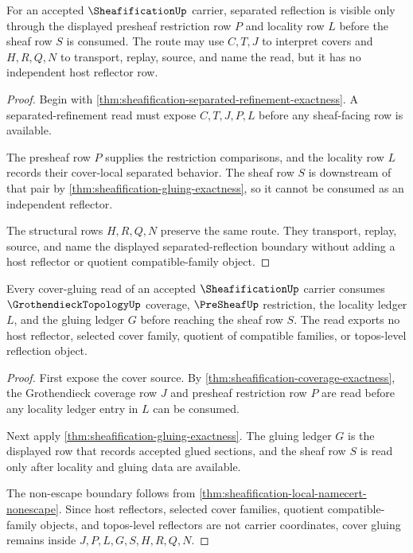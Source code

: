\begin{theorem}
\label{thm:sheafification-separated-reflection-route}
For an accepted $\SheafificationUp$ carrier, separated reflection is visible only through the displayed presheaf restriction row $P$ and locality row $L$ before the sheaf row $S$ is consumed. The route may use $C,T,J$ to interpret covers and $H,R,Q,N$ to transport, replay, source, and name the read, but it has no independent host reflector row.
\end{theorem}
\begin{proof}
Begin with \autoref{thm:sheafification-separated-refinement-exactness}. A separated-refinement read must expose $C,T,J,P,L$ before any sheaf-facing row is available.

The presheaf row $P$ supplies the restriction comparisons, and the locality row $L$ records their cover-local separated behavior. The sheaf row $S$ is downstream of that pair by \autoref{thm:sheafification-gluing-exactness}, so it cannot be consumed as an independent reflector.

The structural rows $H,R,Q,N$ preserve the same route. They transport, replay, source, and name the displayed separated-reflection boundary without adding a host reflector or quotient compatible-family object.
\end{proof}

\begin{theorem}
\label{thm:sheafification-cover-gluing-nonescape}
Every cover-gluing read of an accepted $\SheafificationUp$ carrier consumes $\GrothendieckTopologyUp$ coverage, $\PreSheafUp$ restriction, the locality ledger $L$, and the gluing ledger $G$ before reaching the sheaf row $S$. The read exports no host reflector, selected cover family, quotient of compatible families, or topos-level reflection object.
\end{theorem}
\begin{proof}
First expose the cover source. By \autoref{thm:sheafification-coverage-exactness}, the Grothendieck coverage row $J$ and presheaf restriction row $P$ are read before any locality ledger entry in $L$ can be consumed.

Next apply \autoref{thm:sheafification-gluing-exactness}. The gluing ledger $G$ is the displayed row that records accepted glued sections, and the sheaf row $S$ is read only after locality and gluing data are available.

The non-escape boundary follows from \autoref{thm:sheafification-local-namecert-nonescape}. Since host reflectors, selected cover families, quotient compatible-family objects, and topos-level reflectors are not carrier coordinates, cover gluing remains inside $J,P,L,G,S,H,R,Q,N$.
\end{proof}

